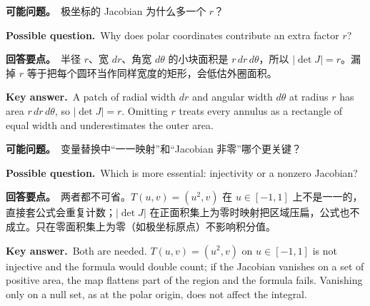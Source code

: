 \documentclass[UTF8,11pt,a4paper]{ctexart}
\newcommand{\ASK}[4]{\begin{samepage}\par\noindent\textbf{可能问题。}\ #1\par\noindent\textbf{Possible question.}\ #2\par\noindent\textbf{回答要点。}\ #3\par\noindent\textbf{Key answer.}\ #4\medskip\end{samepage}}
\begin{document}
\ASK{极坐标的 Jacobian 为什么多一个 $r$？}{Why does polar coordinates contribute an extra factor $r$?}{半径 $r$、宽 $dr$、角宽 $d\theta$ 的小块面积是 $r\,dr\,d\theta$，所以 $|\det J|=r$。漏掉 $r$ 等于把每个圆环当作同样宽度的矩形，会低估外圈面积。}{A patch of radial width $dr$ and angular width $d\theta$ at radius $r$ has area $r\,dr\,d\theta$, so $|\det J|=r$. Omitting $r$ treats every annulus as a rectangle of equal width and underestimates the outer area.}
\ASK{变量替换中“一一映射”和“Jacobian 非零”哪个更关键？}{Which is more essential: injectivity or a nonzero Jacobian?}{两者都不可省。$T(u,v)=(u^2,v)$ 在 $u\in[-1,1]$ 上不是一一的，直接套公式会重复计数；$|\det J|$ 在正面积集上为零时映射把区域压扁，公式也不成立。只在零面积集上为零（如极坐标原点）不影响积分值。}{Both are needed. $T(u,v)=(u^2,v)$ on $u\in[-1,1]$ is not injective and the formula would double count; if the Jacobian vanishes on a set of positive area, the map flattens part of the region and the formula fails. Vanishing only on a null set, as at the polar origin, does not affect the integral.}
\end{document}
